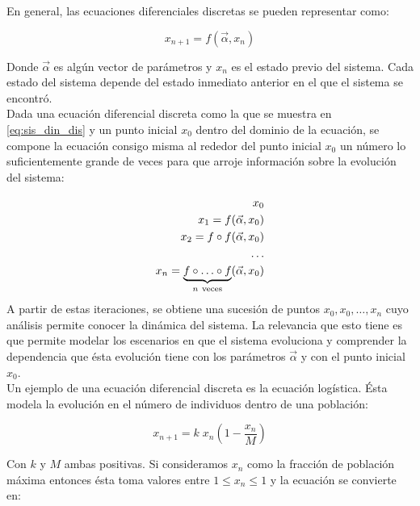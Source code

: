 \documentclass[letterpaper,12pt,oneside]{book}
\begin{document}
En general, las ecuaciones diferenciales discretas se pueden representar como:

\begin{equation}
    x_{n + 1} = f(\Vec{\alpha}, x_{n})
    \label{eq:sis_din_dis}
\end{equation}

Donde $\Vec{\alpha}$ es algún vector de parámetros y $x_{n}$ es el estado previo del sistema. Cada estado del sistema depende del estado inmediato anterior en el que el sistema se encontró.
\\

Dada una ecuación diferencial discreta como la que se muestra en \ref{eq:sis_din_dis} y un punto inicial $x_{0}$ dentro del dominio de la ecuación, se compone la ecuación consigo misma al rededor del punto inicial $x_{0}$ un número lo suficientemente grande de veces para que arroje información sobre la evolución del sistema:

\begin{equation}
    \begin{split}
    x_{0} \\
    x_{1} = f(\Vec{\alpha}, x_{0}) \\
    x_{2} = f \circ f(\Vec{\alpha}, x_{0}) \\ 
    \ldots \\
    x_{n} = \raisebox{0pt}[\height][0pt]{$\underbrace{f \circ \ldots \circ f}_{n\ \text{veces}}$} (\Vec{\alpha}, x_{0})
    \end{split}
    \label{eq:iteraciones}
\end{equation} \\

A partir de estas iteraciones, se obtiene una sucesión de puntos ${ {x_{0},  x_{0}, \ldots , x_{n}} }$ cuyo análisis permite conocer la dinámica del sistema. La relevancia que esto tiene es que permite modelar los escenarios en que el sistema evoluciona y comprender la dependencia que ésta evolución tiene con los parámetros $\Vec{\alpha}$ y con el punto inicial $x_{0}$.
\\

Un ejemplo de una ecuación diferencial discreta es la ecuación logística. Ésta modela la evolución en el número de individuos dentro de una población:

\begin{equation*}
x_{n+1} = k \;  x_{n} \left (1 - \frac{x_{n}}{M} \right )
\end{equation*}

Con $k$ y $M$ ambas positivas. Si consideramos $x_{n}$ como la fracción de población máxima entonces ésta toma valores entre $1 \leq x_{n} \leq 1 $ y la ecuación se convierte en:
\end{document}
